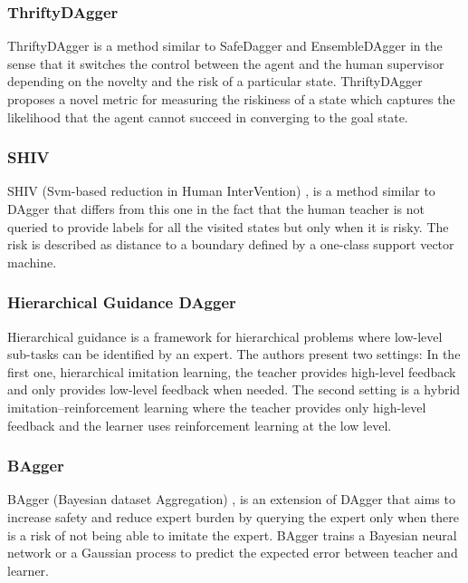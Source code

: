 \subsubsection*{ThriftyDAgger}
ThriftyDAgger \cite{ThriftyDAgger} is a method similar to SafeDagger \cite{SafeDAgger-Zhang-Cho:2016} and EnsembleDAgger \cite{EnsembleDAgger-Menda:2019} in the sense that it switches the control between the agent and the human supervisor depending on the novelty and the risk of a particular state. ThriftyDAgger proposes a novel metric for measuring the riskiness of a state which captures the likelihood that the agent cannot succeed in converging to the goal state.


\subsubsection*{SHIV}
SHIV (Svm-based reduction in Human InterVention) \cite{SHIV-Laskey:2016},  is a method similar to DAgger \cite{DAgger-Ross:2011} that differs from this one in the fact that the human teacher is not queried to provide labels for all the visited states but only when it is risky. The risk is described as distance to a boundary defined by a one-class support vector machine.

\subsubsection*{Hierarchical Guidance DAgger}
Hierarchical guidance \cite{Hierarchical-guidance-Le:2018} is a framework for hierarchical problems where low-level sub-tasks can be identified by an expert. The authors present two settings: In the first one, hierarchical imitation learning,  the teacher provides high-level feedback and only provides low-level feedback when needed. The second setting is a hybrid imitation–reinforcement learning where the teacher provides only high-level feedback and the learner uses reinforcement learning at the low level.



\subsubsection*{BAgger}
BAgger (Bayesian  dataset  Aggregation) \cite{BAgger-Cronrath:2018}, is an extension of DAgger \cite{DAgger-Ross:2011} that aims to increase safety and reduce expert burden by querying the expert only when there is a risk of not being able to imitate the expert. BAgger trains a Bayesian neural network or a Gaussian process to predict the expected error between teacher and learner.


















